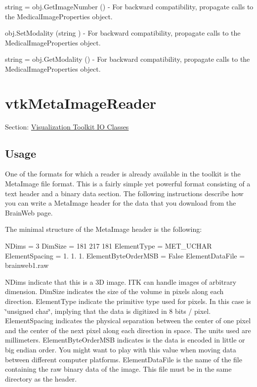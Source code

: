 \begin{DoxyItemize}
\item {\ttfamily string = obj.\-Get\-Image\-Number ()} -\/ For backward compatibility, propagate calls to the Medical\-Image\-Properties object.  
\item {\ttfamily obj.\-Set\-Modality (string )} -\/ For backward compatibility, propagate calls to the Medical\-Image\-Properties object.  
\item {\ttfamily string = obj.\-Get\-Modality ()} -\/ For backward compatibility, propagate calls to the Medical\-Image\-Properties object.  
\end{DoxyItemize}\hypertarget{vtkio_vtkmetaimagereader}{}\section{vtk\-Meta\-Image\-Reader}\label{vtkio_vtkmetaimagereader}
Section\-: \hyperlink{sec_vtkio}{Visualization Toolkit I\-O Classes} \hypertarget{vtkwidgets_vtkxyplotwidget_Usage}{}\subsection{Usage}\label{vtkwidgets_vtkxyplotwidget_Usage}
One of the formats for which a reader is already available in the toolkit is the Meta\-Image file format. This is a fairly simple yet powerful format consisting of a text header and a binary data section. The following instructions describe how you can write a Meta\-Image header for the data that you download from the Brain\-Web page.

The minimal structure of the Meta\-Image header is the following\-:

N\-Dims = 3 Dim\-Size = 181 217 181 Element\-Type = M\-E\-T\-\_\-\-U\-C\-H\-A\-R Element\-Spacing = 1. 1. 1. Element\-Byte\-Order\-M\-S\-B = False Element\-Data\-File = brainweb1.\-raw

N\-Dims indicate that this is a 3\-D image. I\-T\-K can handle images of arbitrary dimension. Dim\-Size indicates the size of the volume in pixels along each direction. Element\-Type indicate the primitive type used for pixels. In this case is \char`\"{}unsigned char\char`\"{}, implying that the data is digitized in 8 bits / pixel. Element\-Spacing indicates the physical separation between the center of one pixel and the center of the next pixel along each direction in space. The units used are millimeters. Element\-Byte\-Order\-M\-S\-B indicates is the data is encoded in little or big endian order. You might want to play with this value when moving data between different computer platforms. Element\-Data\-File is the name of the file containing the raw binary data of the image. This file must be in the same directory as the header.


